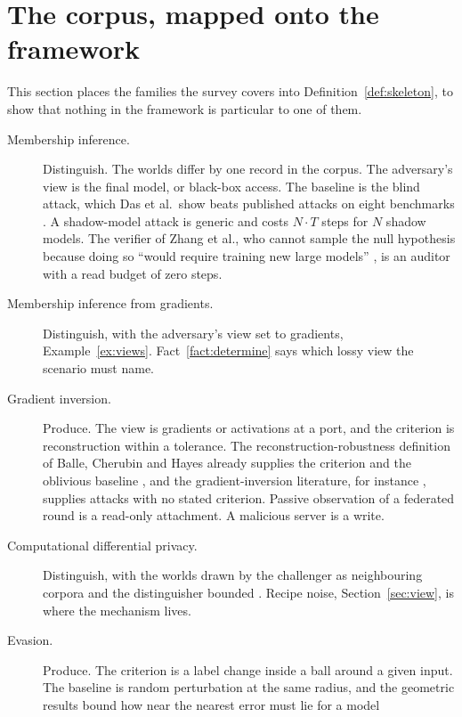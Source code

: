 \documentclass[11pt]{article}
\theoremstyle{definition}
\theoremstyle{plain}
\theoremstyle{remark}
\begin{document}


\section{The corpus, mapped onto the framework}
\label{sec:map}

This section places the families the survey covers into
Definition~\ref{def:skeleton}, to show that nothing in the framework is particular
to one of them.

\begin{description}
  \item[Membership inference.] Distinguish. The worlds differ by one record in the
        corpus. The adversary's view is the final model, or black-box access. The
        baseline is the blind attack, which Das et al.\ show beats published
        attacks on eight benchmarks \cite{DZT25}. A shadow-model attack
        \cite{SSSS17,CCNSTT22} is generic and costs $N \cdot T$ steps for $N$ shadow
        models. The verifier of Zhang et al., who cannot sample the null hypothesis
        because doing so ``would require training new large models''
        \cite{ZDKT25}, is an auditor with a read budget of zero steps.
  \item[Membership inference from gradients.] Distinguish, with the adversary's
        view set to gradients, Example~\ref{ex:views}. Fact~\ref{fact:determine}
        says which lossy view the scenario must name.
  \item[Gradient inversion.] Produce. The view is gradients or activations at a
        port, and the criterion is reconstruction within a tolerance. The
        reconstruction-robustness definition of Balle, Cherubin and Hayes already
        supplies the criterion and the oblivious baseline \cite{BCH22}, and the
        gradient-inversion literature, for instance \cite{BDJV22}, supplies
        attacks with no stated criterion. Passive observation of a federated round
        is a read-only attachment. A malicious server is a write.
  \item[Computational differential privacy.] Distinguish, with the worlds drawn by
        the challenger as neighbouring corpora and the distinguisher bounded
        \cite{MPRV09}. Recipe noise, Section~\ref{sec:view}, is where the mechanism
        lives.
  \item[Evasion.] Produce. The criterion is a label change inside a ball around a
        given input. The baseline is random perturbation at the same radius, and the
        geometric results bound how near the nearest error must lie for a model

\end{description}
\end{document}
